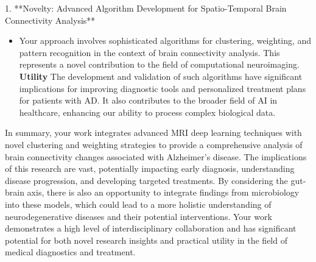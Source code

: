 \documentclass[twocolumn]{article}
\begin{document}
1. **Novelty: Advanced Algorithm Development for Spatio-Temporal Brain Connectivity Analysis**
\begin{itemize}
\item Your approach involves sophisticated algorithms for clustering, weighting, and pattern recognition in the context of brain connectivity analysis. This represents a novel contribution to the field of computational neuroimaging.
   \noindent \textbf{Utility} The development and validation of such algorithms have significant implications for improving diagnostic tools and personalized treatment plans for patients with AD. It also contributes to the broader field of AI in healthcare, enhancing our ability to process complex biological data.
\end{itemize}
In summary, your work integrates advanced MRI deep learning techniques with novel clustering and weighting strategies to provide a comprehensive analysis of brain connectivity changes associated with Alzheimer's disease. The implications of this research are vast, potentially impacting early diagnosis, understanding disease progression, and developing targeted treatments. By considering the gut-brain axis, there is also an opportunity to integrate findings from microbiology into these models, which could lead to a more holistic understanding of neurodegenerative diseases and their potential interventions. Your work demonstrates a high level of interdisciplinary collaboration and has significant potential for both novel research insights and practical utility in the field of medical diagnostics and treatment.
\end{document}
